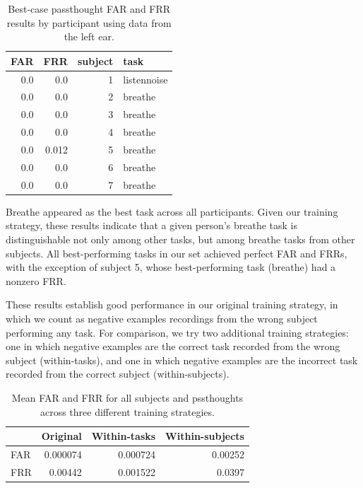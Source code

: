 \documentclass[letterpaper,twocolumn,10pt]{article}
\begin{document}
\begin{table}[h]
\begin{center}
\begin{tabular}{rrrl}
FAR & FRR & subject & task\\
\hline
0.0 & 0.0 & 1 & listennoise\\
0.0 & 0.0 & 2 & breathe\\
0.0 & 0.0 & 3 & breathe\\
0.0 & 0.0 & 4 & breathe\\
0.0 & 0.012 & 5 & breathe\\
0.0 & 0.0 & 6 & breathe\\
0.0 & 0.0 & 7 & breathe\\
\end{tabular}
\end{center}
\caption{Best-case passthought FAR and FRR results by participant using data from the left ear.}
\label{tab:best}
\end{table}

Breathe appeared as the best task across all participants. Given our training strategy, these results indicate that a given person's breathe task is distinguishable not only among other tasks, but among breathe tasks from other subjects.
All best-performing tasks in our set achieved perfect FAR and FRRs, with the exception of subject 5, whose best-performing task (breathe) had a nonzero FRR.

These results establish good performance in our original training strategy, in which we count as negative examples recordings from the wrong subject performing any task. For comparison, we try two additional training strategies: one in which negative examples are the correct task recorded from the wrong subject (within-tasks), and one in which negative examples are the incorrect task recorded from the correct subject (within-subjects).

\begin{table}[h]
\begin{center}
\begin{tabular}{lrrr}
 & Original & Within-tasks & Within-subjects\\
\hline
FAR & 0.000074 & 0.000724 & 0.00252\\
FRR & 0.00442 & 0.001522 & 0.0397\\
\end{tabular}
\end{center}
\caption{Mean FAR and FRR for all subjects and pssthoughts across three different training strategies.}
\label{tab:compare}
\end{table}
\end{document}
